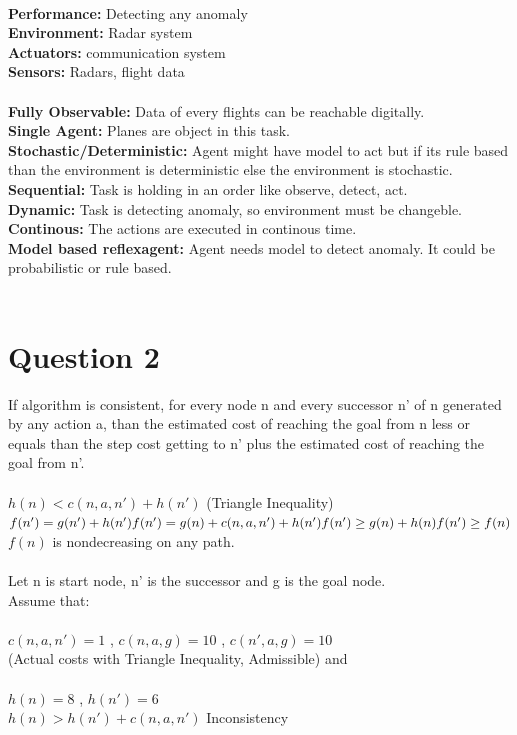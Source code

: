 \documentclass[a4paper,11pt]{report}
\begin{document}
\\
\textbf{Performance:} Detecting any anomaly\\
\textbf{Environment:} Radar system\\
\textbf{Actuators:} communication system\\
\textbf{Sensors:} Radars, flight data\\
\\
\textbf{Fully Observable:} Data of every flights can be reachable digitally.\\
\textbf{Single Agent:} Planes are object in this task.\\
\textbf{Stochastic/Deterministic:} Agent might have model to act but if its rule based than the environment is deterministic else the environment is stochastic.\\
\textbf{Sequential:} Task is holding in an order like observe, detect, act.\\
\textbf{Dynamic:} Task is detecting anomaly, so environment must be changeble.\\
\textbf{Continous:} The actions are executed in continous time. \\
\textbf{Model based reflexagent:} Agent needs model to detect anomaly. It could be probabilistic or rule based.\\
\\
\newpage 

\section*{Question 2}

If algorithm is consistent, for every node n and every successor n' of n generated by any action a, than the estimated cost of
reaching the goal from n less or equals than the step cost getting to n' plus the estimated cost of reaching the goal
from n'.\\
\\
$ h(n) < c(n,a,n') + h(n') $ (Triangle Inequality)\\
\begin{math}
 f(n') = g(n') + h(n')\\
 f(n') = g(n) + c(n,a,n') + h(n')\\
 f(n') \geq g(n) + h(n)\\
 f(n') \geq f(n)\\
\end{math}
\\$f(n)$ is nondecreasing on any path.\\
\\
Let n is start node, n' is the successor and g is the goal node.\\
Assume that:\\
\\$c(n,a,n') = 1$ , $c(n,a,g) = 10$ , $c(n',a,g) = 10$\\ (Actual costs with Triangle Inequality, Admissible) and\\
\\$h(n) = 8$ , $h(n') = 6$\\
$h(n) > h(n') + c(n,a,n')$ Inconsistency\\
\newpage
\end{document}
